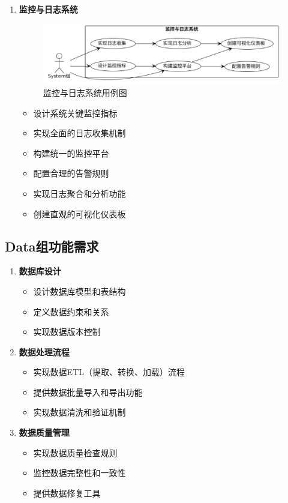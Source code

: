 \documentclass[a4paper,12pt]{article}
\begin{document}
\begin{enumerate}
  \item \textbf{监控与日志系统}
  
  \begin{figure}[H]
    \centering
    \includegraphics[width=0.75\linewidth]{assets/image7.png}
    \caption{监控与日志系统用例图}
    \label{fig:monitoring-logging}
  \end{figure}
  
  \begin{itemize}
    \item 设计系统关键监控指标
    \item 实现全面的日志收集机制
    \item 构建统一的监控平台
    \item 配置合理的告警规则
    \item 实现日志聚合和分析功能
    \item 创建直观的可视化仪表板
  \end{itemize}
\end{enumerate}

\subsection{Data组功能需求}

\begin{enumerate}
  \item \textbf{数据库设计}
  \begin{itemize}
    \item 设计数据库模型和表结构
    \item 定义数据约束和关系
    \item 实现数据版本控制
  \end{itemize}
  
  \item \textbf{数据处理流程}
  \begin{itemize}
    \item 实现数据ETL（提取、转换、加载）流程
    \item 提供数据批量导入和导出功能
    \item 实现数据清洗和验证机制
  \end{itemize}
  
  \item \textbf{数据质量管理}
  \begin{itemize}
    \item 实现数据质量检查规则
    \item 监控数据完整性和一致性
    \item 提供数据修复工具
  \end{itemize}
\end{enumerate}
\end{document}
